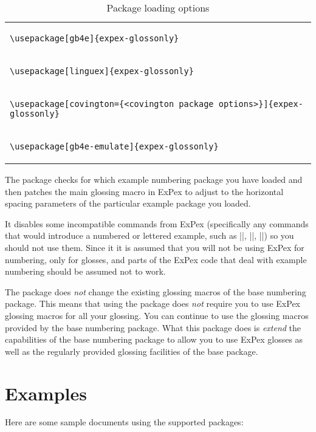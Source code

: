 \documentclass[11pt]{article}
\begin{document}
\begin{table}
\centering
\caption{Package loading options}
\begin{tabular}{l}
\toprule
\begin{lstlisting}[frame=none]
\usepackage[gb4e]{expex-glossonly}
\end{lstlisting}\\
\begin{lstlisting}[frame=none]
\usepackage[linguex]{expex-glossonly}
\end{lstlisting}\\
\begin{lstlisting}[frame=none]
\usepackage[covington={<covington package options>}]{expex-glossonly}
\end{lstlisting}\\
\begin{lstlisting}[frame=none]
\usepackage[gb4e-emulate]{expex-glossonly}
\end{lstlisting}\\
\bottomrule
\end{tabular}
\end{table}

The package checks for which example numbering package you have loaded and then patches the main glossing macro in ExPex to adjust to the horizontal spacing parameters of the particular example package you loaded.

It disables some incompatible commands from ExPex (specifically any commands that would introduce a numbered or lettered example, such as |\ex|, |\pex|, |\xe|) so you should not use them. Since it it is assumed that you will not be using ExPex for numbering, only for glosses, and parts of the ExPex code that deal with example numbering should be assumed not to work.

The package does \emph{not} change the existing glossing macros of the base numbering package. This means that using the package does \emph{not} require you to use ExPex glossing macros for all your glossing. You can continue to use the glossing macros provided by the base numbering package. What this package does is \emph{extend} the capabilities of the base numbering package to allow you to use ExPex glosses as well as the regularly provided glossing facilities of the base package. 
\section{Examples}
Here are some sample documents using the supported packages:
\end{document}
